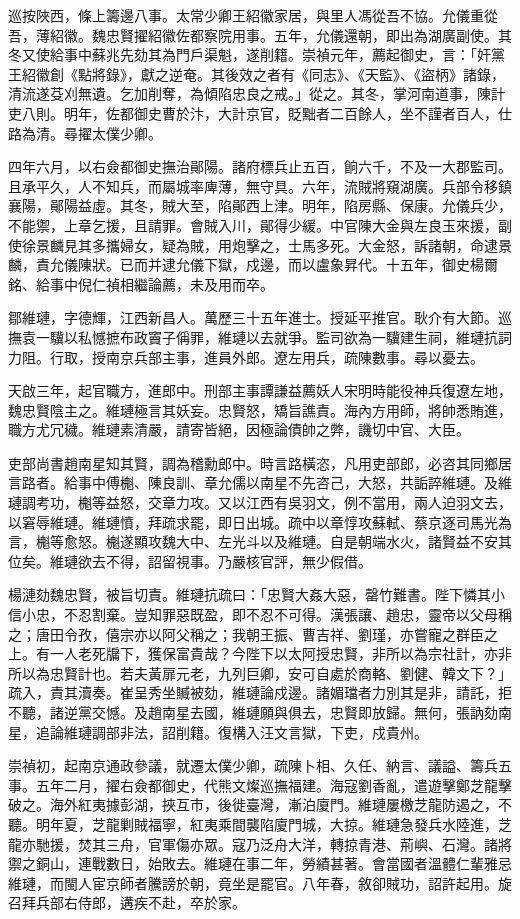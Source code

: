\begin{pinyinscope}
巡按陜西，條上籌邊八事。太常少卿王紹徽家居，與里人馮從吾不協。允儀重從吾，薄紹徽。魏忠賢擢紹徽佐都察院用事。五年，允儀還朝，即出為湖廣副使。其冬又使給事中蘇兆先劾其為門戶渠魁，遂削籍。崇禎元年，薦起御史，言：「奸黨王紹徽創《點將錄》，獻之逆奄。其後效之者有《同志》、《天監》、《盜柄》諸錄，清流遂芟刈無遺。乞加削奪，為傾陷忠良之戒。」從之。其冬，掌河南道事，陳計吏八則。明年，佐都御史曹於汴，大計京官，貶黜者二百餘人，坐不謹者百人，仕路為清。尋擢太僕少卿。

四年六月，以右僉都御史撫治鄖陽。諸府標兵止五百，餉六千，不及一大郡監司。且承平久，人不知兵，而屬城率庳薄，無守具。六年，流賊將窺湖廣。兵部令移鎮襄陽，鄖陽益虛。其冬，賊大至，陷鄖西上津。明年，陷房縣、保康。允儀兵少，不能禦，上章乞援，且請罪。會賊入川，鄖得少緩。中官陳大金與左良玉來援，副使徐景麟見其多攜婦女，疑為賊，用炮擊之，士馬多死。大金怒，訴諸朝，命逮景麟，責允儀陳狀。已而并逮允儀下獄，戍邊，而以盧象昇代。十五年，御史楊爾銘、給事中倪仁禎相繼論薦，未及用而卒。

鄒維璉，字德輝，江西新昌人。萬歷三十五年進士。授延平推官。耿介有大節。巡撫袁一驥以私憾摭布政竇子偁罪，維璉以去就爭。監司欲為一驥建生祠，維璉抗詞力阻。行取，授南京兵部主事，進員外郎。遼左用兵，疏陳數事。尋以憂去。

天啟三年，起官職方，進郎中。刑部主事譚謙益薦妖人宋明時能役神兵復遼左地，魏忠賢陰主之。維璉極言其妖妄。忠賢怒，矯旨譙責。海內方用師，將帥悉賄進，職方尤冗穢。維璉素清嚴，請寄皆絕，因極論債帥之弊，譏切中官、大臣。

吏部尚書趙南星知其賢，調為稽勳郎中。時言路橫恣，凡用吏部郎，必咨其同鄉居言路者。給事中傅櫆、陳良訓、章允儒以南星不先咨己，大怒，共詬誶維璉。及維璉調考功，櫆等益怒，交章力攻。又以江西有吳羽文，例不當用，兩人迫羽文去，以窘辱維璉。維璉憤，拜疏求罷，即日出城。疏中以章惇攻蘇軾、蔡京逐司馬光為言，櫆等愈怒。櫆遂顯攻魏大中、左光斗以及維璉。自是朝端水火，諸賢益不安其位矣。維璉欲去不得，詔留視事。乃嚴核官評，無少假借。

楊漣劾魏忠賢，被旨切責。維璉抗疏曰：「忠賢大姦大惡，罄竹難書。陛下憐其小信小忠，不忍割棄。豈知罪惡既盈，即不忍不可得。漢張讓、趙忠，靈帝以父母稱之；唐田令孜，僖宗亦以阿父稱之；我朝王振、曹吉祥、劉瑾，亦嘗寵之群臣之上。有一人老死牖下，獲保富貴哉？今陛下以太阿授忠賢，非所以為宗社計，亦非所以為忠賢計也。若夫黃扉元老，九列巨卿，安可自處於商輅、劉健、韓文下？」疏入，責其瀆奏。崔呈秀坐贓被劾，維璉論戍邊。諸媚璫者力別其是非，請託，拒不聽，諸逆黨交憾。及趙南星去國，維璉願與俱去，忠賢即放歸。無何，張訥劾南星，追論維璉調部非法，詔削籍。復構入汪文言獄，下吏，戍貴州。

崇禎初，起南京通政參議，就遷太僕少卿，疏陳卜相、久任、納言、議謚、籌兵五事。五年二月，擢右僉都御史，代熊文燦巡撫福建。海寇劉香亂，遣遊擊鄭芝龍擊破之。海外紅夷據彭湖，挾互市，後徙臺灣，漸泊廈門。維璉屢檄芝龍防遏之，不聽。明年夏，芝龍剿賊福寧，紅夷乘間襲陷廈門城，大掠。維璉急發兵水陸進，芝龍亦馳援，焚其三舟，官軍傷亦眾。寇乃泛舟大洋，轉掠青港、荊嶼、石灣。諸將禦之銅山，連戰數日，始敗去。維璉在事二年，勞績甚著。會當國者溫體仁輩雅忌維璉，而閩人宦京師者騰謗於朝，竟坐是罷官。八年春，敘卻賊功，詔許起用。旋召拜兵部右侍郎，遘疾不赴，卒於家。


\end{pinyinscope}

